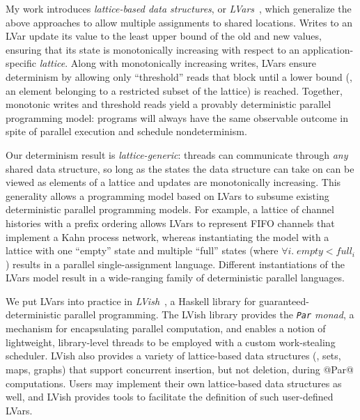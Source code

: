 \documentclass{article}
\begin{document}

My work introduces \emph{lattice-based data structures}, or
\emph{LVars}~\cite{LVars-paper, LVars-TR}, which generalize the above
approaches to allow multiple assignments to shared locations.  Writes
to an LVar update its value to the least upper bound of the old and
new values, ensuring that its state is monotonically increasing with
respect to an application-specific \emph{lattice}.  Along with
monotonically increasing writes, LVars ensure determinism by allowing
only ``threshold'' reads that block until a lower bound (\ie, an
element belonging to a restricted subset of the lattice) is reached.
Together, monotonic writes and threshold reads yield a provably
deterministic parallel programming model: programs will always have
the same observable outcome in spite of parallel execution and
schedule nondeterminism.

Our determinism result is \emph{lattice-generic}: threads can
communicate through \emph{any} shared data structure, so long as the
states the data structure can take on can be viewed as elements of a
lattice and updates are monotonically increasing.  This generality
allows a programming model based on LVars to subsume existing
deterministic parallel programming models.  For example, a lattice of
channel histories with a prefix ordering allows LVars to represent
FIFO channels that implement a Kahn process network, whereas
instantiating the model with a lattice with one ``empty'' state and
multiple ``full'' states (where $\forall{i}.\; \mathit{empty} <
\mathit{full_i}$) results in a parallel single-assignment language.
Different instantiations of the LVars model result in a wide-ranging
family of deterministic parallel languages.

We put LVars into practice in \emph{LVish}~\cite{LVish}, a Haskell
library for guaranteed-deterministic parallel programming.  The LVish
library provides the \emph{\lstinline|Par| monad}, a mechanism for
encapsulating parallel computation, and enables a notion of
lightweight, library-level threads to be employed with a custom
work-stealing scheduler.  LVish also provides a variety of
lattice-based data structures (\eg, sets, maps, graphs) that support
concurrent insertion, but not deletion, during @Par@ computations.
Users may implement their own lattice-based data structures as well,
and LVish provides tools to facilitate the definition of such
user-defined LVars.
\end{document}
